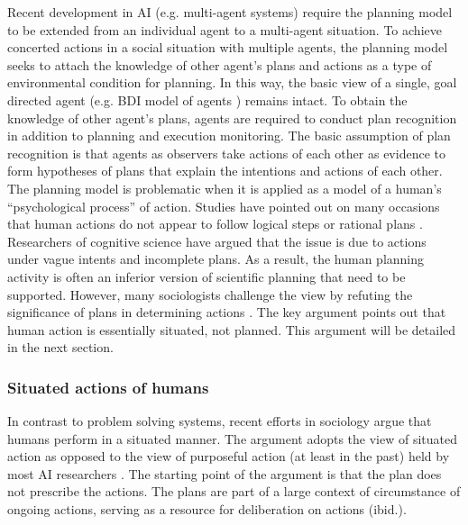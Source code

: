 
Recent development in \ac{AI} (e.g. multi-agent systems) require the planning model to be extended from an individual agent to a multi-agent situation. To achieve concerted actions in a social situation with multiple agents, the planning model seeks to attach the knowledge of other agent's plans and actions as a type of environmental condition for planning. In this way, the basic view of a single, goal directed agent (e.g. BDI model of agents \citep{Georgeff1999}) remains intact. To obtain the knowledge of other agent's plans, agents are required to conduct plan recognition in addition to planning and execution monitoring. The basic assumption of plan recognition is that agents as observers take actions of each other as evidence to form hypotheses of plans that explain the intentions and actions of each other.  \\

The planning model is problematic when it is applied as a model of a  human's ``psychological process'' of action. Studies have pointed out on many occasions that human actions do not appear to follow logical steps or rational plans \citep{Suchman1987}. Researchers of cognitive science have argued that the issue is due to actions under vague intents and incomplete plans. As a result, the human planning activity is often an inferior version of scientific planning that need to be supported. However, many sociologists challenge the view by refuting the significance of plans in determining actions  \citep{Suchman1987}. The key argument points out that human action is essentially situated, not planned. This argument will be detailed in the next section.\\ 

\subsubsection{Situated actions of humans}
In contrast to problem solving systems, recent efforts in sociology argue that humans perform in a situated manner. The argument adopts the view of situated action as opposed to the view of purposeful action (at least in the past) held by most \ac{AI} researchers \citep{Suchman1987}. The starting point of the argument is that the plan does not prescribe the actions. The plans are part of a large context of circumstance of ongoing actions, serving as a resource for deliberation on actions (ibid.).\\

